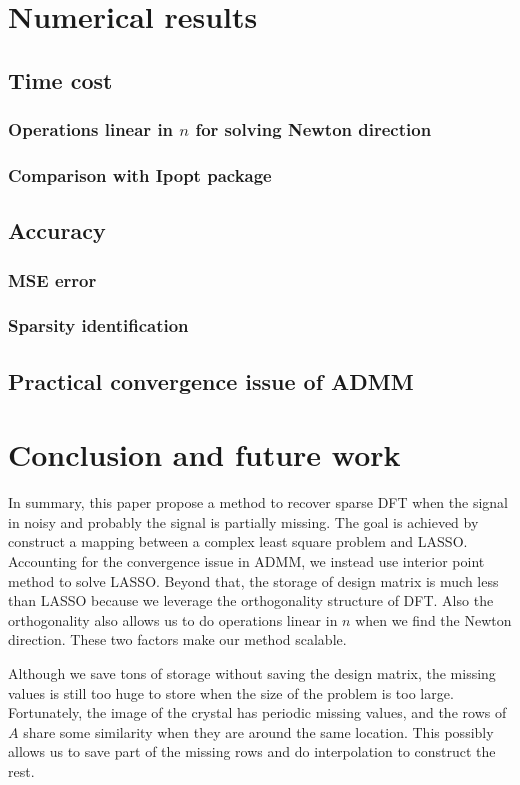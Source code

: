 \documentclass[final,onefignum,onetabnum]{siamart190516}
\begin{document}
\section{Numerical results}
\subsection{Time cost}
\subsubsection{Operations linear in $n$ for solving Newton direction}
\subsubsection{Comparison with Ipopt package}
\subsection{Accuracy}
\subsubsection{MSE error}
\subsubsection{Sparsity identification}
\subsection{Practical convergence issue of ADMM}

\section{Conclusion and future work} In summary, this paper propose a method to recover sparse DFT when the signal in noisy and probably the signal is partially missing. The goal is achieved by construct a mapping between a complex least square problem and LASSO. Accounting for the convergence issue in ADMM, we instead use interior point method to solve LASSO. Beyond that, the storage of design matrix is much less than LASSO because we leverage the orthogonality structure of DFT. Also the orthogonality also allows us to do operations linear in $n$ when we find the Newton direction. These two factors make our method scalable.

Although we save tons of storage without saving the design matrix, the missing values is still too huge to store when the size of the problem is too large. Fortunately, the image of the crystal has periodic missing values, and the rows of $A$ share some similarity when they are around the same location. This possibly allows us to save part of the missing rows and do interpolation to construct the rest.


\end{document}
